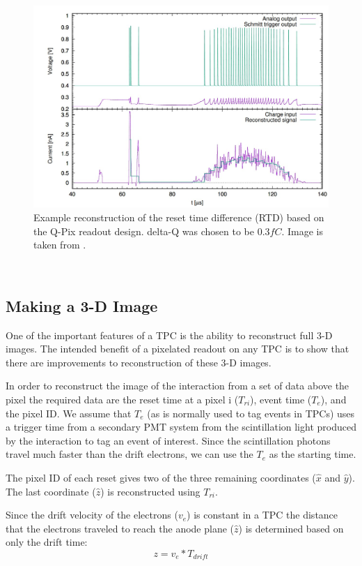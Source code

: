 \begin{figure}[]
\centering
\includegraphics[width=\textwidth]{images/qpix_rtd_reconstruction_example_03fc.jpg}
\caption{Example reconstruction of the reset time difference (RTD) based on the Q-Pix readout design. delta-Q was chosen to be $0.3 fC$. Image is taken from \citep{qpix:nygren:mei}.}
\end{figure}
~\label{fig:qpixRecon2}

\subsection{Making a 3-D Image}

One of the important features of a TPC is the ability to reconstruct full 3-D images.
The intended benefit of a pixelated readout on any TPC is to show that there are improvements to reconstruction of these 3-D images.

In order to reconstruct the image of the interaction from a set of data above the pixel the required data are the reset time at a pixel i ($T_{ri}$), event time ($T_{e}$), and the pixel ID.
We assume that $T_{e}$ (as is normally used to tag events in TPCs) uses a trigger time from a secondary PMT system from the scintillation light produced by the interaction to tag an event of interest.
Since the scintillation photons travel much faster than the drift electrons, we can use the $T_{e}$ as the starting time.

The pixel ID of each reset gives two of the three remaining coordinates ($\hat{x}$ and $\hat{y}$).
The last coordinate ($\hat{z}$) is reconstructed using $T_{ri}$.

Since the drift velocity of the electrons ($v_{e}$) is constant in a TPC the distance that the electrons traveled to reach the anode plane ($\hat{z}$) is determined based on only the drift time:
\begin{equation}
  z = v_{e} * T_{drift}
\end{equation}~\label{eq:driftDistance}

